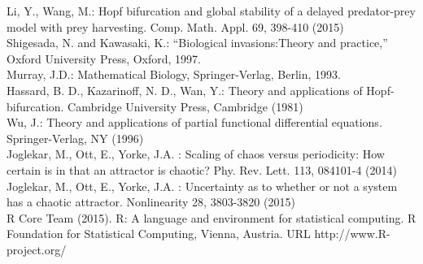 \documentclass[10pt]{amsart}
\theoremstyle{definition}
\begin{document}
\begin{thebibliography}{3}
 Li, Y., Wang, M.: Hopf bifurcation and global stability of a delayed  predator-prey model with prey harvesting. Comp. Math. Appl. 69, 398-410 (2015)\\  

 Shigesada, N. and Kawasaki, K.: ``Biological invasions:Theory and practice,''  Oxford University Press, Oxford, 1997.\\

 Murray, J.D.: Mathematical Biology, Springer-Verlag, Berlin, 1993.\\

 Hassard, B. D., Kazarinoff, N. D., Wan, Y.: Theory and applications of Hopf-bifurcation. Cambridge University Press, Cambridge (1981)\\

 Wu, J.: Theory and applications of partial functional differential equations. Springer-Verlag, NY (1996)\\

 Joglekar, M., Ott, E., Yorke, J.A. : Scaling of chaos versus periodicity: How certain is in that an attractor is chaotic? Phy. Rev. Lett. 113, 084101-4 (2014)\\  

 Joglekar, M., Ott, E., Yorke, J.A. : Uncertainty as to whether or not a system has a chaotic attractor. Nonlinearity 28, 3803-3820 (2015)\\  

   R Core Team (2015). R: A language and environment for statistical computing. R Foundation for Statistical Computing, Vienna, Austria. URL http://www.R-project.org/\\

\end{thebibliography}
\end{document}
